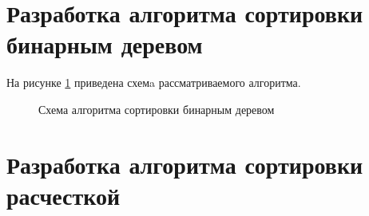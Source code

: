 \section{Разработка алгоритма сортировки бинарным деревом}

На рисунке \ref{fig:bin_tree} приведена схемa рассматриваемого алгоритма.
\FloatBarrier
\begin{figure}[h]
	
	\caption{Схема алгоритма сортировки бинарным деревом}
	\label{fig:bin_tree}
\end{figure}
\FloatBarrier
\clearpage

\section{Разработка алгоритма сортировки расчесткой}

